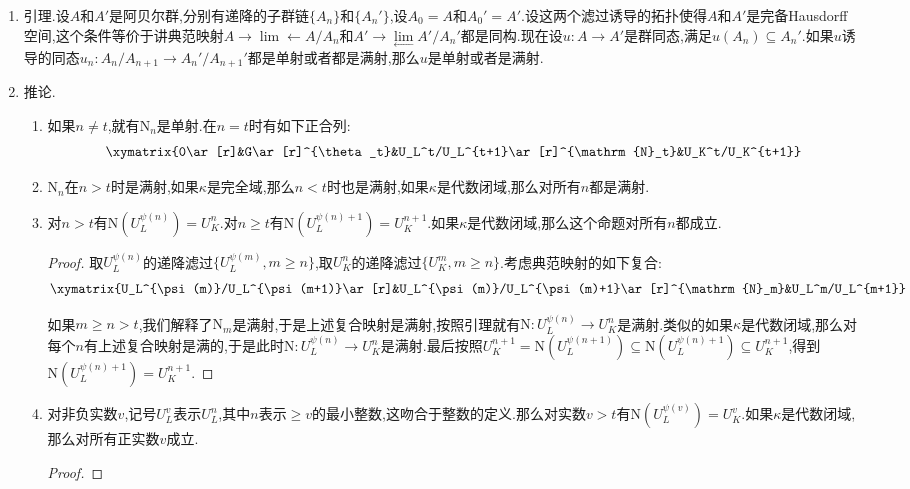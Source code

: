 \begin{enumerate}
\begin{proof}
		如果$n>t$.我们有$\psi(n)=t+l(n-t)$.计算共轭差积得到$\mathrm{Tr}(\mathfrak{n}^{\psi(n)})=\mathfrak{m}^n$.另外有$\mathrm{N}(\mathfrak{n}^{\psi(n)})\subseteq\mathfrak{m}^{\psi(n)}\subseteq\mathfrak{m}^{n+1}$中.于是在$\mathrm{mod}\mathfrak{m}^{n+1}$下就有$\mathrm{N}(1+x)\equiv1+\mathrm{Tr}(x)$.于是$\mathrm{N}_n$把$U_L^{\psi(n)}$映入$U_K^n$,把$U_L^{\psi(n)+1}$映入$U_K^{n+1}$.于是类似之前的情况有$\beta_n\in\kappa$使得$\mathrm{N}_n(\xi)=\beta_n\xi$.倘若$\beta_n=0$,按照上述同余式就有$\mathrm{Tr}(\mathfrak{n}^{\psi(n)})\subseteq\mathfrak{m}^{n+1}$.但是这和$\mathrm{Tr}(\mathfrak{n}^{\psi(n)})=\mathfrak{m}^n$矛盾.于是$\beta_n\not=0$,于是$\mathrm{N}_n$是双射.
	\end{proof}
    \item 引理.设$A$和$A'$是阿贝尔群,分别有递降的子群链$\{A_n\}$和$\{A_n'\}$,设$A_0=A$和$A_0'=A'$.设这两个滤过诱导的拓扑使得$A$和$A'$是完备Hausdorff空间,这个条件等价于讲典范映射$A\to\lim\limits{\leftarrow}A/A_n$和$A'\to\lim\limits_{\leftarrow}A'/A_n'$都是同构.现在设$u:A\to A'$是群同态,满足$u(A_n)\subseteq A_n'$.如果$u$诱导的同态$u_n:A_n/A_{n+1}\to A_n'/A_{n+1}'$都是单射或者都是满射,那么$u$是单射或者是满射.
	\item 推论.
	\begin{enumerate}
		\item 如果$n\not=t$,就有$\mathrm{N}_n$是单射.在$n=t$时有如下正合列:
		$$\xymatrix{0\ar[r]&G\ar[r]^{\theta_t}&U_L^t/U_L^{t+1}\ar[r]^{\mathrm{N}_t}&U_K^t/U_K^{t+1}}$$
		\item $\mathrm{N}_n$在$n>t$时是满射,如果$\kappa$是完全域,那么$n<t$时也是满射,如果$\kappa$是代数闭域,那么对所有$n$都是满射.
		\item 对$n>t$有$\mathrm{N}(U_L^{\psi(n)})=U_K^n$.对$n\ge t$有$\mathrm{N}(U_L^{\psi(n)+1})=U_K^{n+1}$.如果$\kappa$是代数闭域,那么这个命题对所有$n$都成立.
		\begin{proof}
			
			取$U_L^{\psi(n)}$的递降滤过$\{U_L^{\psi(m)},m\ge n\}$,取$U_K^n$的递降滤过$\{U_K^m,m\ge n\}$.考虑典范映射的如下复合:
			$$\xymatrix{U_L^{\psi(m)}/U_L^{\psi(m+1)}\ar[r]&U_L^{\psi(m)}/U_L^{\psi(m)+1}\ar[r]^{\mathrm{N}_m}&U_L^m/U_L^{m+1}}$$
			
			如果$m\ge n>t$,我们解释了$\mathrm{N}_m$是满射,于是上述复合映射是满射,按照引理就有$\mathrm{N}:U_L^{\psi(n)}\to U_K^n$是满射.类似的如果$\kappa$是代数闭域,那么对每个$n$有上述复合映射是满的,于是此时$\mathrm{N}:U_L^{\psi(n)}\to U_K^n$是满射.最后按照$U_K^{n+1}=\mathrm{N}(U_L^{\psi(n+1)})\subseteq\mathrm{N}(U_L^{\psi(n)+1})\subseteq U_K^{n+1}$,得到$\mathrm{N}(U_L^{\psi(n)+1})=U_K^{n+1}$.
		\end{proof}
	    \item 对非负实数$v$,记号$U_L^v$表示$U_L^n$,其中$n$表示$\ge v$的最小整数,这吻合于整数的定义.那么对实数$v>t$有$\mathrm{N}(U_L^{\psi(v)})=U_K^v$.如果$\kappa$是代数闭域,那么对所有正实数$v$成立.
	    \begin{proof}
	    	

\end{proof}
\end{enumerate}
\end{enumerate}
